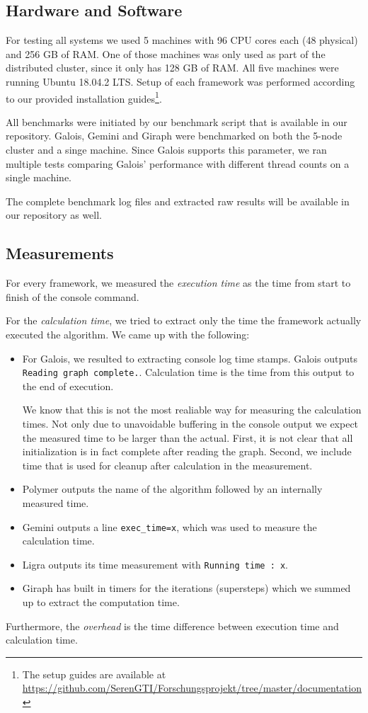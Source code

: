 
\subsection{Hardware and Software}
For testing all systems we used 5 machines with 96 CPU cores each (48 physical) and 256 GB of RAM. One of those machines was only used as part of the distributed cluster, since it only has 128 GB of RAM.
All five machines were running Ubuntu 18.04.2 LTS.
Setup of each framework was performed according to our provided installation guides\footnote{The setup guides are available at \url{https://github.com/SerenGTI/Forschungsprojekt/tree/master/documentation}}.

All benchmarks were initiated by our benchmark script that is available in our repository. Galois, Gemini and Giraph were benchmarked on both the 5-node cluster and a singe machine.
Since Galois supports this parameter, we ran multiple tests comparing Galois' performance with different thread counts on a single machine.

The complete benchmark log files and extracted raw results will be available in our repository as well.

\subsection{Measurements}
For every framework, we measured the \emph{execution time} as the time from start to finish of the console command.

For the \emph{calculation time}, we tried to extract only the time the framework actually executed the algorithm. We came up with the following:
\begin{itemize}
	\item For Galois, we resulted to extracting console log time stamps. Galois outputs \texttt{Reading graph complete.}. Calculation time is the time from this output to the end of execution.

	We know that this is not the most realiable way for measuring the calculation times. 
	Not only due to unavoidable buffering in the console output we expect the measured time to be larger than the actual.
	First, it is not clear that all initialization is in fact complete after reading the graph. Second, we include time that is used for cleanup after calculation in the measurement.

	\item Polymer outputs the name of the algorithm followed by an internally measured time.

	\item Gemini outputs a line \texttt{exec\_time=x}, which was used to measure the calculation time.

	\item Ligra outputs its time measurement with \texttt{Running time : x}.

	\item Giraph has built in timers for the iterations (supersteps) which we summed up to extract the computation time.
\end{itemize}
Furthermore, the \emph{overhead} is the time difference between execution time and calculation time.

